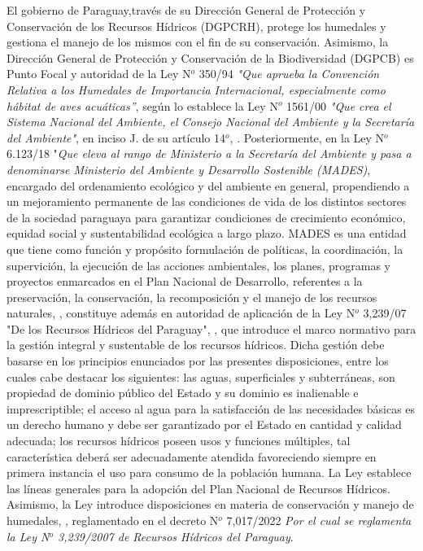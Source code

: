 El gobierno de Paraguay,trav\'es de su Direcci\'on General de Protecci\'on y Conservaci\'on de los Recursos H\'idricos (DGPCRH), protege los humedales y gestiona el manejo de los mismos con el fin de su conservaci\'on. Asimismo, la Direcci\'on General de Protecci\'on y Conservaci\'on de la Biodiversidad (DGPCB) es Punto Focal y autoridad de la Ley N$^{o}$ 350/94 \textit{"Que aprueba la Convenci\'on Relativa a los Humedales de Importancia Internacional, especialmente como h\'abitat de aves acu\'aticas”}, seg\'un lo establece la Ley N$^{o}$ 1561/00 \textit{"Que crea el Sistema Nacional del Ambiente, el Consejo Nacional del Ambiente y la Secretar\'ia del Ambiente"}, en inciso J. de su art\'iculo 14$^{o}$, \cite{direccion_general_de_proteccion_y_sitios_nodate}. 
Posteriormente, en la Ley N$^{o}$ 6.123/18 "\textit{Que eleva al rango de Ministerio a la Secretar\'ia del Ambiente y pasa a denominarse Ministerio del Ambiente y Desarrollo Sostenible (MADES)}, encargado del ordenamiento ecol\'ogico y del ambiente en general, propendiendo a un mejoramiento permanente de las condiciones de vida de los distintos sectores de la sociedad paraguaya para garantizar condiciones de crecimiento econ\'omico, equidad social y sustentabilidad ecol\'ogica a largo plazo. 
MADES es una entidad que tiene como funci\'on y prop\'osito formulaci\'on de pol\'iticas, la coordinaci\'on, la supervici\'on, la ejecuci\'on de las acciones ambientales, los planes, programas y proyectos enmarcados en el Plan Nacional de Desarrollo, referentes a la preservaci\'on, la conservaci\'on, la recomposici\'on y el manejo de los recursos naturales, \cite{mades_antecedentes_nodate}, constituye además  en autoridad de aplicación de la Ley N$^{o}$ 3,239/07 "De los Recursos Hídricos del Paraguay", \cite{noauthor_presidente_nodate}, que introduce el marco normativo para la gestión integral y sustentable de los recursos hídricos. 
Dicha gestión debe basarse en los principios enunciados por las presentes disposiciones, entre los cuales cabe destacar los siguientes: las aguas, superficiales y subterráneas, son propiedad de dominio público del Estado y su dominio es inalienable e imprescriptible; el acceso al agua para la satisfacción de las necesidades básicas es un derecho humano y debe ser garantizado por el Estado en cantidad y calidad adecuada; los recursos hídricos poseen usos y funciones múltiples, tal característica deberá ser adecuadamente atendida favoreciendo siempre en primera instancia el uso para consumo de la población humana. 
La Ley establece las líneas generales para la adopción del Plan Nacional de Recursos Hídricos. Asimismo, la Ley introduce disposiciones en materia de conservación y manejo de humedales, \cite{ley_n_323907_ley_2007}, reglamentado en el  decreto N$^{o}$ 7,017/2022 \textit{Por el cual se reglamenta la Ley N$^{o}$ 3,239/2007 de Recursos Hídricos del Paraguay}.
